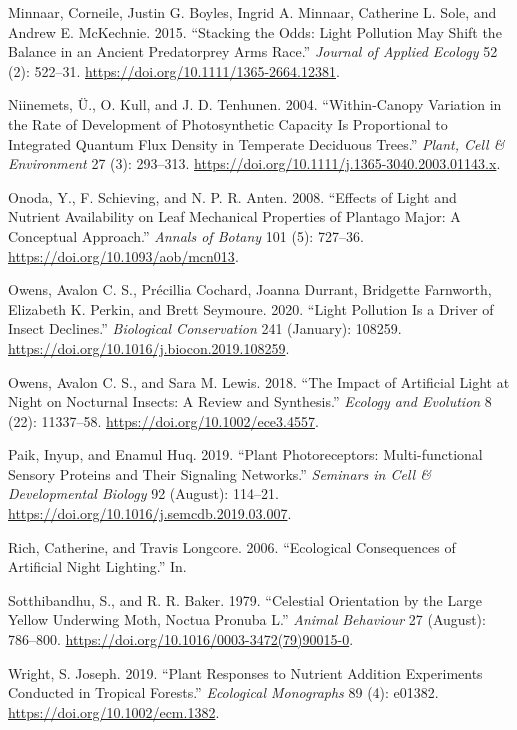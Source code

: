 \documentclass[
]{article}
\newlength{\cslhangindent}
\newlength{\cslentryspacingunit} %
\newenvironment{CSLReferences}[2] %
 {%
  \setlength{\parindent}{0pt}
  \ifodd #1
  \let\oldpar\par
  \def\par{\hangindent=\cslhangindent\oldpar}
  \fi
  \setlength{\parskip}{#2\cslentryspacingunit}
 }%
 {}
\begin{document}
\begin{CSLReferences}{1}{0}
\leavevmode{}%
Minnaar, Corneile, Justin G. Boyles, Ingrid A. Minnaar, Catherine L.
Sole, and Andrew E. McKechnie. 2015. {``Stacking the Odds: Light
Pollution May Shift the Balance in an Ancient Predator\textendash prey
Arms Race.''} \emph{Journal of Applied Ecology} 52 (2): 522--31.
\url{https://doi.org/10.1111/1365-2664.12381}.

\leavevmode{}%
Niinemets, Ü., O. Kull, and J. D. Tenhunen. 2004. {``Within-Canopy
Variation in the Rate of Development of Photosynthetic Capacity Is
Proportional to Integrated Quantum Flux Density in Temperate Deciduous
Trees.''} \emph{Plant, Cell \& Environment} 27 (3): 293--313.
\url{https://doi.org/10.1111/j.1365-3040.2003.01143.x}.

\leavevmode{}%
Onoda, Y., F. Schieving, and N. P. R. Anten. 2008. {``Effects of {Light}
and {Nutrient Availability} on {Leaf Mechanical Properties} of
{Plantago} Major: {A Conceptual Approach}.''} \emph{Annals of Botany}
101 (5): 727--36. \url{https://doi.org/10.1093/aob/mcn013}.

\leavevmode{}%
Owens, Avalon C. S., Précillia Cochard, Joanna Durrant, Bridgette
Farnworth, Elizabeth K. Perkin, and Brett Seymoure. 2020. {``Light
Pollution Is a Driver of Insect Declines.''} \emph{Biological
Conservation} 241 (January): 108259.
\url{https://doi.org/10.1016/j.biocon.2019.108259}.

\leavevmode{}%
Owens, Avalon C. S., and Sara M. Lewis. 2018. {``The Impact of
Artificial Light at Night on Nocturnal Insects: {A} Review and
Synthesis.''} \emph{Ecology and Evolution} 8 (22): 11337--58.
\url{https://doi.org/10.1002/ece3.4557}.

\leavevmode{}%
Paik, Inyup, and Enamul Huq. 2019. {``Plant Photoreceptors:
{Multi-functional} Sensory Proteins and Their Signaling Networks.''}
\emph{Seminars in Cell \& Developmental Biology} 92 (August): 114--21.
\url{https://doi.org/10.1016/j.semcdb.2019.03.007}.

\leavevmode{}%
Rich, Catherine, and Travis Longcore. 2006. {``Ecological Consequences
of Artificial Night Lighting.''} In.

\leavevmode{}%
Sotthibandhu, S., and R. R. Baker. 1979. {``Celestial Orientation by the
Large Yellow Underwing Moth, {Noctua} Pronuba {L}.''} \emph{Animal
Behaviour} 27 (August): 786--800.
\url{https://doi.org/10.1016/0003-3472(79)90015-0}.

\leavevmode{}%
Wright, S. Joseph. 2019. {``Plant Responses to Nutrient Addition
Experiments Conducted in Tropical Forests.''} \emph{Ecological
Monographs} 89 (4): e01382. \url{https://doi.org/10.1002/ecm.1382}.

\end{CSLReferences}
\end{document}

